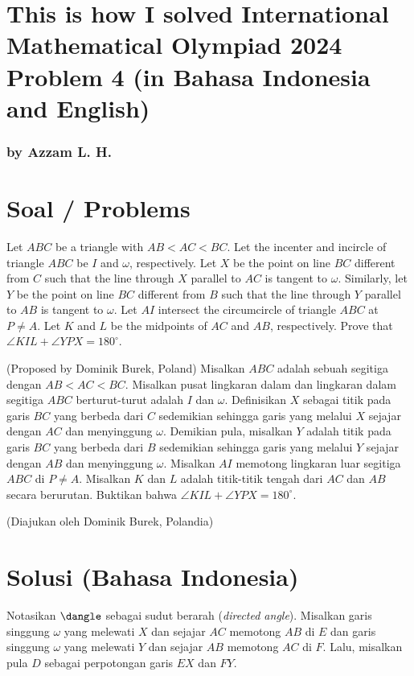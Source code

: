 \section*{This is how I solved International Mathematical Olympiad 2024 Problem 4 (in Bahasa Indonesia and English)}
\subsubsection*{by Azzam L. H.}


\newpage
\renewcommand*\contentsname{Daftar Isi / Content}
\tableofcontents

\newpage

\section{Soal / Problems}
Let $ABC$ be a triangle with $AB < AC < BC$. Let the incenter and incircle of triangle $ABC$ be $I$ and $\omega$, respectively. Let $X$ be the point on line $BC$ different from $C$ such that the line through $X$ parallel to $AC$ is tangent to $\omega$. Similarly, let $Y$ be the point on line $BC$ different from $B$ such that the line through $Y$ parallel to $AB$ is tangent to $\omega$. Let $AI$ intersect the circumcircle of triangle $ABC$ at $P \ne A$. Let $K$ and $L$ be the midpoints of $AC$ and $AB$, respectively.
Prove that $\angle KIL + \angle YPX = 180^{\circ}$.

(Proposed by Dominik Burek, Poland)
\newline
\newline
Misalkan $ABC$ adalah sebuah segitiga dengan $AB < AC < BC$. Misalkan pusat lingkaran dalam dan lingkaran dalam segitiga $ABC$ berturut-turut adalah $I$ dan $\omega$. Definisikan $X$ sebagai titik pada garis $BC$ yang berbeda dari $C$ sedemikian sehingga garis yang melalui $X$ sejajar dengan $AC$ dan menyinggung $\omega$. Demikian pula, misalkan $Y$ adalah titik pada garis $BC$ yang berbeda dari $B$ sedemikian sehingga garis yang melalui $Y$ sejajar dengan $AB$ dan menyinggung $\omega$. Misalkan $AI$ memotong lingkaran luar segitiga $ABC$ di $P \ne A$. Misalkan $K$ dan $L$ adalah titik-titik tengah dari $AC$ dan $AB$ secara berurutan.
Buktikan bahwa $\angle KIL + \angle YPX = 180^{\circ}$.

(Diajukan oleh Dominik Burek, Polandia)
\newpage
\section{Solusi (Bahasa Indonesia)}

Notasikan $\dangle$ sebagai sudut berarah (\textit{directed angle}).
Misalkan garis singgung $\omega$ yang melewati $X$ dan sejajar $AC$ memotong $AB$ di $E$ dan garis singgung $\omega$ yang melewati $Y$ dan sejajar $AB$ memotong $AC$ di $F$. Lalu, misalkan pula $D$ sebagai perpotongan garis $EX$ dan $FY$.

